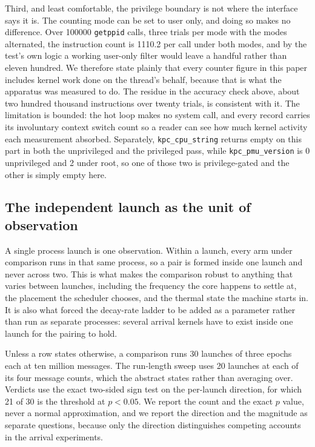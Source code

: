 \documentclass[conference]{IEEEtran}
\begin{document}
Third, and least comfortable, the privilege boundary is not where the interface
says it is. The counting mode can be set to user only, and doing so makes no
difference. Over 100000 \texttt{getppid} calls, three trials per mode with the
modes alternated, the instruction count is 1110.2 per call under both modes, and
by the test's own logic a working user-only filter would leave a handful rather
than eleven hundred. We therefore state plainly that every counter figure in
this paper includes kernel work done on the thread's behalf, because that is
what the apparatus was measured to do. The residue in the accuracy check above,
about two hundred thousand instructions over twenty trials, is consistent with
it. The limitation is bounded: the hot loop makes no system call, and every
record carries its involuntary context switch count so a reader can see how much
kernel activity each measurement absorbed. Separately, \texttt{kpc\_cpu\_string}
returns empty on this part in both the unprivileged and the privileged pass,
while \texttt{kpc\_pmu\_version} is 0 unprivileged and 2 under root, so one of
those two is privilege-gated and the other is simply empty here.

\subsection{The independent launch as the unit of observation}

A single process launch is one observation. Within a launch, every arm under
comparison runs in that same process, so a pair is formed inside one launch and
never across two. This is what makes the comparison robust to anything that
varies between launches, including the frequency the core happens to settle at,
the placement the scheduler chooses, and the thermal state the machine starts
in. It is also what forced the decay-rate ladder to be added as a parameter
rather than run as separate processes: several arrival kernels have to exist
inside one launch for the pairing to hold.

Unless a row states otherwise, a comparison runs 30 launches of three epochs
each at ten million messages. The run-length sweep uses 20 launches at each of
its four message counts, which the abstract states rather than averaging over.
Verdicts use the exact two-sided sign test on the per-launch direction, for
which 21 of 30 is the threshold at $p < 0.05$. We report the count and the exact
$p$ value, never a normal approximation, and we report the direction and the
magnitude as separate questions, because only the direction distinguishes
competing accounts in the arrival experiments.
\end{document}
